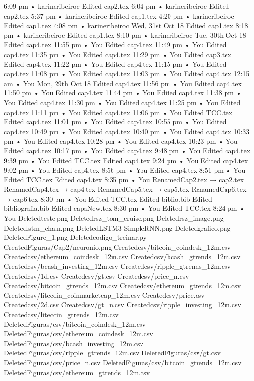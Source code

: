 6:09 pm • karineribeiroc
Edited cap2.tex
6:04 pm • karineribeiroc
Edited cap2.tex
5:37 pm • karineribeiroc
Edited cap1.tex
4:20 pm • karineribeiroc
Edited cap1.tex
4:08 pm • karineribeiroc
Wed, 31st Oct 18
Edited cap1.tex
8:18 pm • karineribeiroc
Edited cap1.tex
8:10 pm • karineribeiroc
Tue, 30th Oct 18
Edited cap4.tex
11:55 pm • You
Edited cap4.tex
11:49 pm • You
Edited cap4.tex
11:35 pm • You
Edited cap4.tex
11:29 pm • You
Edited cap3.tex
Edited cap4.tex
11:22 pm • You
Edited cap4.tex
11:15 pm • You
Edited cap4.tex
11:08 pm • You
Edited cap4.tex
11:03 pm • You
Edited cap4.tex
12:15 am • You
Mon, 29th Oct 18
Edited cap4.tex
11:56 pm • You
Edited cap4.tex
11:50 pm • You
Edited cap4.tex
11:44 pm • You
Edited cap4.tex
11:38 pm • You
Edited cap4.tex
11:30 pm • You
Edited cap4.tex
11:25 pm • You
Edited cap4.tex
11:11 pm • You
Edited cap4.tex
11:06 pm • You
Edited TCC.tex
Edited cap4.tex
11:01 pm • You
Edited cap4.tex
10:55 pm • You
Edited cap4.tex
10:49 pm • You
Edited cap4.tex
10:40 pm • You
Edited cap4.tex
10:33 pm • You
Edited cap4.tex
10:28 pm • You
Edited cap4.tex
10:23 pm • You
Edited cap4.tex
10:17 pm • You
Edited cap4.tex
9:48 pm • You
Edited cap4.tex
9:39 pm • You
Edited TCC.tex
Edited cap4.tex
9:24 pm • You
Edited cap4.tex
9:02 pm • You
Edited cap4.tex
8:56 pm • You
Edited cap4.tex
8:51 pm • You
Edited TCC.tex
Edited cap4.tex
8:35 pm • You
RenamedCap2.tex → cap2.tex
RenamedCap4.tex → cap4.tex
RenamedCap5.tex → cap5.tex
RenamedCap6.tex → cap6.tex
8:30 pm • You
Edited TCC.tex
Edited biblio.bib
Edited bibliografia.bib
Edited capaNew.tex
8:30 pm • You
Edited TCC.tex
8:24 pm • You
Deletedteste.png
Deletedrsz_tom_cruise.png
Deletedrsz_image.png
Deletedlstm_chain.png
DeletedLSTM3-SimpleRNN.png
Deletedgrafico.png
DeletedFigure_1.png
Deletedcodigo_treinar.py
CreatedFiguras/Cap2/neuronio.png
Createdcsv/bitcoin_coindesk_12m.csv
Createdcsv/ethereum_coindesk_12m.csv
Createdcsv/bcash_gtrends_12m.csv
Createdcsv/bcash_investing_12m.csv
Createdcsv/ripple_gtrends_12m.csv
Createdcsv/1d.csv
Createdcsv/gt.csv
Createdcsv/price_n.csv
Createdcsv/bitcoin_gtrends_12m.csv
Createdcsv/ethereum_gtrends_12m.csv
Createdcsv/litecoin_coinmarketcap_12m.csv
Createdcsv/price.csv
Createdcsv/2d.csv
Createdcsv/gt_n.csv
Createdcsv/ripple_investing_12m.csv
Createdcsv/litecoin_gtrends_12m.csv
DeletedFiguras/csv/bitcoin_coindesk_12m.csv
DeletedFiguras/csv/ethereum_coindesk_12m.csv
DeletedFiguras/csv/bcash_investing_12m.csv
DeletedFiguras/csv/ripple_gtrends_12m.csv
DeletedFiguras/csv/gt.csv
DeletedFiguras/csv/price_n.csv
DeletedFiguras/csv/bitcoin_gtrends_12m.csv
DeletedFiguras/csv/ethereum_gtrends_12m.csv
